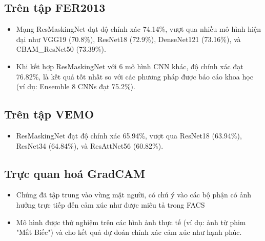 \subsection{Trên tập FER2013}
\begin{itemize}
    \item Mạng ResMaskingNet đạt độ chính xác 74.14\%, vượt qua nhiều mô hình hiện đại như VGG19 (70.8\%), ResNet18 (72.9\%), DenseNet121 (73.16\%), và CBAM\_ResNet50 (73.39\%).
    \item Khi kết hợp ResMaskingNet với 6 mô hình CNN khác, độ chính xác đạt 76.82\%, là kết quả tốt nhất so với các phương pháp được báo cáo khoa học (ví dụ: Ensemble 8 CNNs đạt 75.2\%).
\end{itemize}
\subsection{Trên tập VEMO}
\begin{itemize}
    \item ResMaskingNet đạt độ chính xác 65.94\%, vượt qua ResNet18 (63.94\%), ResNet34 (64.84\%), và ResAttNet56 (60.82\%).
\end{itemize}
\subsection{Trực quan hoá GradCAM}
\begin{itemize}
    \item Chúng đã tập trung vào vùng mặt người, có chú ý vào các bộ phận có ảnh hưởng trực tiếp đến cảm xúc như được miêu tả trong FACS
    \item Mô hình được thử nghiệm trên các hình ảnh thực tế (ví dụ: ảnh từ phim "Mắt Biếc") và cho kết quả dự đoán chính xác cảm xúc như hạnh phúc.
\end{itemize}

